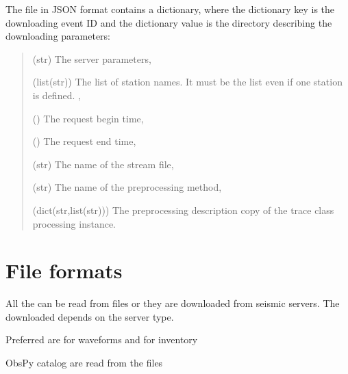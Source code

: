 \documentclass[letterpaper,10pt,english]{sphinxmanual}
\begin{document}
\sphinxAtStartPar
The file in JSON format contains a dictionary,
where the dictionary key is the downloading event ID
and the dictionary value is the directory describing
the downloading parameters:
\begin{quote}\begin{description}
\sphinxAtStartPar
(str) The server parameters,

\sphinxAtStartPar
(list(str)) The list of station names. It must be the list even if one station is defined.
,

\sphinxAtStartPar
() The request begin time,

\sphinxAtStartPar
() The request end time,

\sphinxAtStartPar
(str) The name of the stream file,

\sphinxAtStartPar
(str) The name of the preprocessing method,

\sphinxAtStartPar
(dict(str,list(str))) The preprocessing description \sphinxhyphen{} copy of the trace class
processing instance.

\end{description}\end{quote}


\section{File formats}
\label{\detokenize{io_data:file-formats}}
\sphinxAtStartPar
All the 
can be read from files or they are downloaded from seismic servers. The downloaded depends
on the server type.

\sphinxAtStartPar
Preferred are  for waveforms and  for inventory

\sphinxAtStartPar
ObsPy catalog are read from the  files
\end{document}
